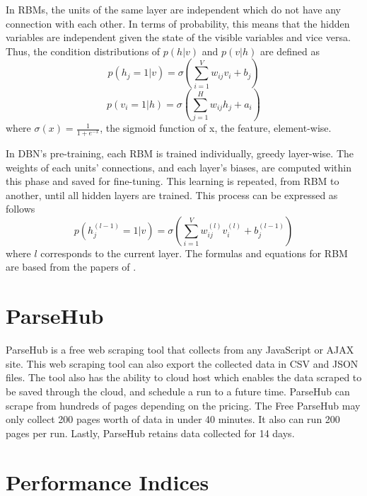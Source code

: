 In RBMs, the units of the same layer are independent which do not have any connection with each other. In terms of probability, this means that the hidden variables are independent given the state of the visible variables and vice versa. Thus, the condition distributions of $p(h|v)$ and $p(v|h)$ are defined as
\begin{equation}\label{eq:4}
p(h_j = 1 | v) = \sigma\left( \sum^V_{i=1} w_{ij}v_i + b_j \right)
\end{equation}
\begin{equation}\label{eq:5}
p(v_i = 1 | h) = \sigma\left( \sum^H_{j=1} w_{ij}h_j + a_i \right)
\end{equation}
\noindent where $\sigma(x) = \frac{1}{1 + e^{-x}}$, the sigmoid function of x, the feature, element-wise.

In DBN’s pre-training, each RBM is trained individually, greedy layer-wise. The weights of each units’ connections, and each layer’s biases, are computed within this phase and saved for fine-tuning. This learning is repeated, from RBM to another, until all hidden layers are trained. This process can be expressed as follows 
\begin{equation}\label{eq:6}
p(h_j^{(l-1)} = 1 | v) = \sigma( \sum^V_{i=1} w_{ij}^{(l)}v_i^{(l)} + b_j^{(l-1)} )
\end{equation}
\noindent where $l$ corresponds to the current layer. 
The formulas and equations for RBM are based from the papers of . 




\section{ParseHub}
ParseHub is a free web scraping tool that collects from any JavaScript or AJAX site. This web scraping tool can also export the collected data in CSV and JSON files. The tool also has the ability to cloud host which enables the data scraped to be saved through the cloud, and schedule a run to a future time. ParseHub can scrape from hundreds of pages depending on the pricing. The Free ParseHub may only collect 200 pages worth of data in under 40 minutes. It also can run 200 pages per run. Lastly, ParseHub retains data collected for 14 days.



\section{Performance Indices}
